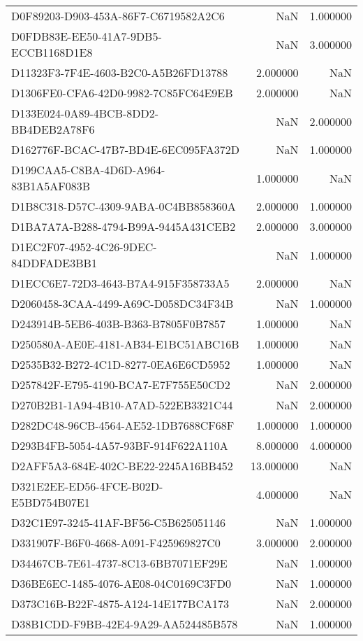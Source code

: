 \begin{tabular}{lrr}
D0F89203-D903-453A-86F7-C6719582A2C6 & NaN & 1.000000 \\
D0FDB83E-EE50-41A7-9DB5-ECCB1168D1E8 & NaN & 3.000000 \\
D11323F3-7F4E-4603-B2C0-A5B26FD13788 & 2.000000 & NaN \\
D1306FE0-CFA6-42D0-9982-7C85FC64E9EB & 2.000000 & NaN \\
D133E024-0A89-4BCB-8DD2-BB4DEB2A78F6 & NaN & 2.000000 \\
D162776F-BCAC-47B7-BD4E-6EC095FA372D & NaN & 1.000000 \\
D199CAA5-C8BA-4D6D-A964-83B1A5AF083B & 1.000000 & NaN \\
D1B8C318-D57C-4309-9ABA-0C4BB858360A & 2.000000 & 1.000000 \\
D1BA7A7A-B288-4794-B99A-9445A431CEB2 & 2.000000 & 3.000000 \\
D1EC2F07-4952-4C26-9DEC-84DDFADE3BB1 & NaN & 1.000000 \\
D1ECC6E7-72D3-4643-B7A4-915F358733A5 & 2.000000 & NaN \\
D2060458-3CAA-4499-A69C-D058DC34F34B & NaN & 1.000000 \\
D243914B-5EB6-403B-B363-B7805F0B7857 & 1.000000 & NaN \\
D250580A-AE0E-4181-AB34-E1BC51ABC16B & 1.000000 & NaN \\
D2535B32-B272-4C1D-8277-0EA6E6CD5952 & 1.000000 & NaN \\
D257842F-E795-4190-BCA7-E7F755E50CD2 & NaN & 2.000000 \\
D270B2B1-1A94-4B10-A7AD-522EB3321C44 & NaN & 2.000000 \\
D282DC48-96CB-4564-AE52-1DB7688CF68F & 1.000000 & 1.000000 \\
D293B4FB-5054-4A57-93BF-914F622A110A & 8.000000 & 4.000000 \\
D2AFF5A3-684E-402C-BE22-2245A16BB452 & 13.000000 & NaN \\
D321E2EE-ED56-4FCE-B02D-E5BD754B07E1 & 4.000000 & NaN \\
D32C1E97-3245-41AF-BF56-C5B625051146 & NaN & 1.000000 \\
D331907F-B6F0-4668-A091-F425969827C0 & 3.000000 & 2.000000 \\
D34467CB-7E61-4737-8C13-6BB7071EF29E & NaN & 1.000000 \\
D36BE6EC-1485-4076-AE08-04C0169C3FD0 & NaN & 1.000000 \\
D373C16B-B22F-4875-A124-14E177BCA173 & NaN & 2.000000 \\
D38B1CDD-F9BB-42E4-9A29-AA524485B578 & NaN & 1.000000 \\

\end{tabular}
